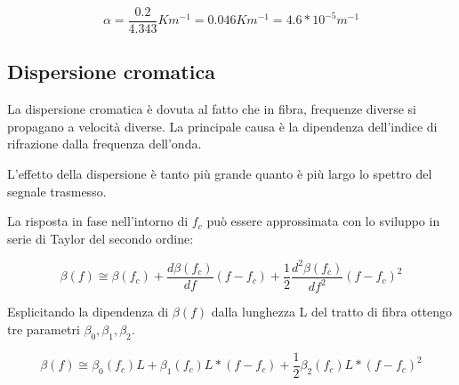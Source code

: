 \documentclass[12pt, a4paper]{article}
\begin{document}
\begin{equation}
	\alpha = \frac{0.2}{4.343} Km^{-1} = 0.046 Km^{-1} = 4.6*10^{-5} m^{-1}
\end{equation}


\vspace{10mm}
\subsection{Dispersione cromatica}
\label{sub:dispersione}

La dispersione cromatica è dovuta al fatto che in fibra, frequenze diverse si propagano a velocità diverse. La principale causa è la dipendenza dell’indice di rifrazione dalla frequenza dell'onda.

L'effetto della dispersione è tanto più grande quanto è più largo lo spettro del segnale trasmesso.

\vspace{5mm}
La risposta in fase nell'intorno di $f_c$ può essere approssimata con lo sviluppo in serie di Taylor del secondo ordine:

\begin{equation}
	\beta(f) \cong \beta(f_c) + \frac{d\beta(f_c)}{df}(f-f_c) + \frac{1}{2}\frac{d^2\beta(f_c)}{df^2}(f-f_c)^2
\end{equation}

Esplicitando la dipendenza di $\beta(f)$ dalla lunghezza L del tratto di fibra ottengo tre parametri $\beta_0 , \beta_1, \beta_2$.

\begin{equation}
	\beta(f) \cong \beta_0(f_c)L + \beta_1(f_c)L*(f-f_c) + \frac{1}{2}\beta_2(f_c)L*(f-f_c)^2
\end{equation}
\end{document}
